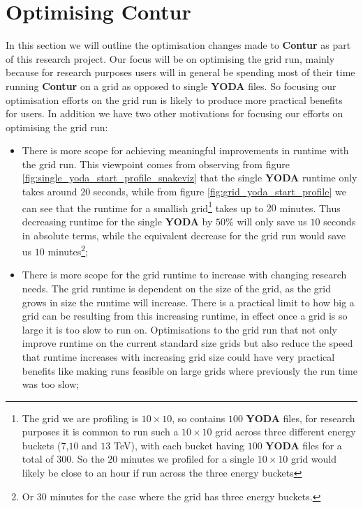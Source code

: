 \chapter{Optimising Contur}
\label{chapterlabel5}
In this section we will outline the optimisation changes made to \textbf{Contur} as part of this research project. Our focus will be on optimising the grid run, mainly because for research purposes users will in general be spending most of their time running \textbf{Contur} on a grid as opposed to single \textbf{YODA} files. So focusing our optimisation efforts on the grid run is likely to produce more practical benefits for users. In addition we have two other motivations for focusing our efforts on optimising the grid run:

\begin{itemize}
\item There is more scope for achieving meaningful improvements in runtime with the grid run. This viewpoint comes from observing from figure \ref{fig:single_yoda_start_profile_snakeviz} that the single \textbf{YODA} runtime only takes around $20$ seconds, while from figure \ref{fig:grid_yoda_start_profile} we can see that the runtime for a smallish grid\footnote{The grid we are profiling is $10 \times 10$, so contains $100$ \textbf{YODA} files, for research purposes it is common to run such a $10 \times 10$ grid across three different energy buckets ($7$,$10$ and $13$ TeV), with each bucket having $100$ \textbf{YODA} files for a total of $300$. So the $20$ minutes we profiled for a single $10 \times 10$ grid would likely be close to an hour if run across the three energy buckets} takes up to $20$ minutes. Thus decreasing runtime for the single \textbf{YODA}  by $50\%$ will only save us $10$ seconds in absolute terms, while the equivalent decrease for the grid run would save us $10$ minutes\footnote{Or $30$ minutes for the case where the grid has three energy buckets.};
\item There is more scope for the grid runtime to increase with changing research needs. The grid runtime is dependent on the size of the grid, as the grid grows in size the runtime will increase. There is a practical limit to how big a grid can be resulting from this increasing runtime, in effect once a grid is so large it is too slow to run on. Optimisations to the grid run that not only improve runtime on the current standard size grids but also reduce the speed that runtime increases with increasing grid size could have very practical benefits like making runs feasible on large grids where previously the run time was too slow;
\end{itemize}

